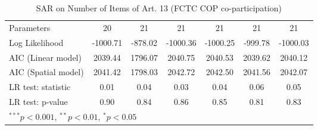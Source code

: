\begin{table}[!h]
\begin{center}
\begin{tabular}{l c c c c c c }
Parameters              & 20           & 21           & 21           & 21           & 21           & 21           \\
Log Likelihood          & -1000.71     & -878.02      & -1000.36     & -1000.25     & -999.78      & -1000.03     \\
AIC (Linear model)      & 2039.44      & 1796.07      & 2040.75      & 2040.53      & 2039.62      & 2040.12      \\
AIC (Spatial model)     & 2041.42      & 1798.03      & 2042.72      & 2042.50      & 2041.56      & 2042.07      \\
LR test: statistic      & 0.01         & 0.04         & 0.03         & 0.04         & 0.06         & 0.05         \\
LR test: p-value        & 0.90         & 0.84         & 0.86         & 0.85         & 0.81         & 0.83         \\
\bottomrule
\multicolumn{7}{l}{\scriptsize{$^{***}p<0.001$, $^{**}p<0.01$, $^*p<0.05$}}
\end{tabular}
\caption{SAR on Number of Items of Art. 13 (FCTC COP co-participation)}
\label{table:coefficients}
\end{center}
\end{table}
